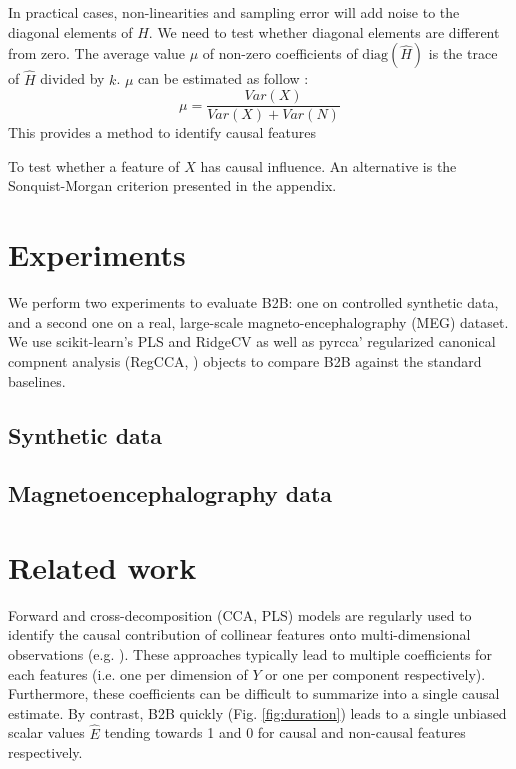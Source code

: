 \documentclass{article}
\begin{document}
In practical cases, non-linearities and sampling error will add noise to the diagonal elements of $\hat H$. We need to test whether diagonal elements are different from zero. The average value $\mu$ of non-zero coefficients of $\text{diag}(\hat H)$ is the trace of $\hat H$ divided by $k$. $\mu$ can be estimated as follow :
\begin{equation}
\mu = \frac{Var(X)}{Var(X)+Var(N)}
\end{equation}
This provides a method to identify causal features

To test whether a feature of $X$ has causal influence. An alternative is the Sonquist-Morgan criterion presented in the appendix.

\section{Experiments}

We perform two experiments to evaluate B2B: one on controlled synthetic data, and a second one on a real, large-scale magneto-encephalography (MEG) dataset.
%
We use scikit-learn's PLS and RidgeCV \citep{sklearn} as well as pyrcca' regularized canonical compnent analysis (RegCCA, \citep{bilenko2016pyrcca}) objects to compare B2B against the standard baselines.

\subsection{Synthetic data}
\label{sec:experiment_synthetic}



\subsection{Magnetoencephalography data}
\label{sec:experiment_real}



\section{Related work}

Forward and cross-decomposition (CCA, PLS) models are regularly used to identify the causal contribution of collinear features onto multi-dimensional observations (e.g. \citep{naselaris2011encoding}). These approaches typically lead to multiple coefficients for each features (i.e. one per dimension of $Y$ or one per component respectively). Furthermore, these  coefficients can be difficult to summarize into a single causal estimate. By contrast, B2B quickly (Fig. \ref{fig:duration}) leads to a single unbiased scalar values $\hat E$ tending towards 1 and 0 for causal and non-causal features respectively.
\end{document}

